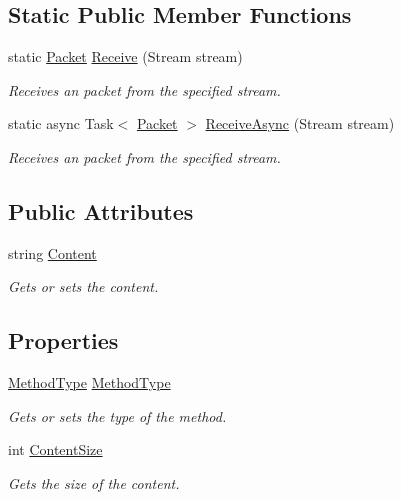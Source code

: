 \subsection*{Static Public Member Functions}
\begin{DoxyCompactItemize}
\item 
static \hyperlink{classCore_1_1Connection_1_1Packet}{Packet} \hyperlink{classCore_1_1Connection_1_1Packet_a1805fbf5de156f012b0e3e20f37cf17c}{Receive} (Stream stream)
\begin{DoxyCompactList}\small\item\em Receives an packet from the specified stream. \end{DoxyCompactList}\item 
static async Task$<$ \hyperlink{classCore_1_1Connection_1_1Packet}{Packet} $>$ \hyperlink{classCore_1_1Connection_1_1Packet_ac3576e6d2fe30dbc9d1aa31d01f13c5d}{Receive\+Async} (Stream stream)
\begin{DoxyCompactList}\small\item\em Receives an packet from the specified stream. \end{DoxyCompactList}\end{DoxyCompactItemize}
\subsection*{Public Attributes}
\begin{DoxyCompactItemize}
\item 
string \hyperlink{classCore_1_1Connection_1_1Packet_a128f7cc2127e4feed69a9cd9a14e7083}{Content}
\begin{DoxyCompactList}\small\item\em Gets or sets the content. \end{DoxyCompactList}\end{DoxyCompactItemize}
\subsection*{Properties}
\begin{DoxyCompactItemize}
\item 
\hyperlink{namespaceCore_1_1Connection_a759585506f1f7f357beb5c5460a7f4f5}{Method\+Type} \hyperlink{classCore_1_1Connection_1_1Packet_a3a1285f0e02eb5a238b7195c36e16fbd}{Method\+Type}
\begin{DoxyCompactList}\small\item\em Gets or sets the type of the method. \end{DoxyCompactList}\item 
int \hyperlink{classCore_1_1Connection_1_1Packet_a78e8987a205544dffdd0b80a4277cd38}{Content\+Size}
\begin{DoxyCompactList}\small\item\em Gets the size of the content. \end{DoxyCompactList}\end{DoxyCompactItemize}


